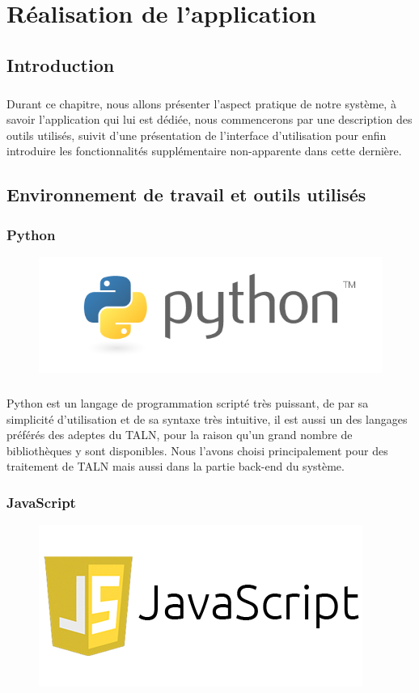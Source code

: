 \documentclass[]{report}
\begin{document}
\chapter{Réalisation de l'application}
	\section{Introduction}
		\paragraph{}
		Durant ce chapitre, nous allons présenter l'aspect pratique de notre système, à savoir l'application qui lui est dédiée, nous commencerons par une description des outils utilisés, suivit d'une présentation de l'interface d'utilisation pour enfin introduire les fonctionnalités supplémentaire non-apparente dans cette dernière.  
	\section{Environnement de travail et outils utilisés}
		\subsection{Python}
			\begin{figure}[H]
				\centering
				\includegraphics[width=0.25\linewidth]{images/python.png}
			\end{figure}
			\paragraph{}
			Python est un langage de programmation scripté très puissant, de par sa simplicité d'utilisation et de sa syntaxe
			très intuitive, il est aussi un des langages préférés des adeptes du TALN, pour la raison qu'un grand nombre de 
			bibliothèques y sont disponibles. Nous l'avons choisi principalement pour des traitement de TALN mais aussi dans la partie
			back-end  du système.
		\subsection{JavaScript}
			\begin{figure}[H]
				\centering
				\includegraphics[width=0.25\linewidth]{images/js.png}
			\end{figure}
\end{document}
